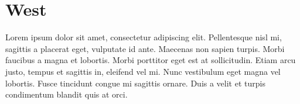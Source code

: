 \documentclass[letterpaper]{report}
\begin{document}
\chapter{West}
Lorem ipsum dolor sit amet, consectetur adipiscing elit. Pellentesque nisl mi, sagittis a placerat eget, vulputate id ante. Maecenas non sapien turpis. Morbi faucibus a magna et lobortis. Morbi porttitor eget est at sollicitudin. Etiam arcu justo, tempus et sagittis in, eleifend vel mi. Nunc vestibulum eget magna vel lobortis. Fusce tincidunt congue mi sagittis ornare. Duis a velit et turpis condimentum blandit quis at orci.
\end{document}
